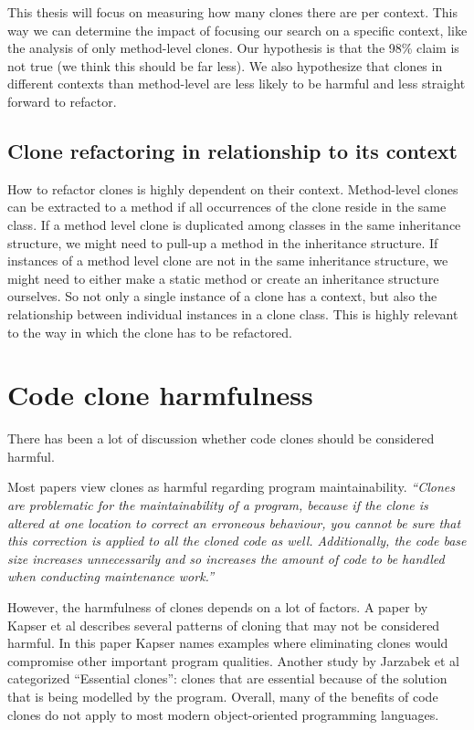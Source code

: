 This thesis will focus on measuring how many clones there are per context. This way we can determine the impact of focusing our search on a specific context, like the analysis of only method-level clones. Our hypothesis is that the 98\% claim is not true (we think this should be far less). We also hypothesize that clones in different contexts than method-level are less likely to be harmful and less straight forward to refactor.

\subsection{Clone refactoring in relationship to its context}
How to refactor clones is highly dependent on their context. Method-level clones can be extracted to a method \cite{kodhai2013method} if all occurrences of the clone reside in the same class. If a method level clone is duplicated among classes in the same inheritance structure, we might need to pull-up a method in the inheritance structure. If instances of a method level clone are not in the same inheritance structure, we might need to either make a static method or create an inheritance structure ourselves. So not only a single instance of a clone has a context, but also the relationship between individual instances in a clone class. This is highly relevant to the way in which the clone has to be refactored.

\section{Code clone harmfulness}
There has been a lot of discussion whether code clones should be considered harmful.

Most papers view clones as harmful regarding program maintainability. \textit{``Clones are problematic for the maintainability of a program, because if the clone is altered at one location to correct an erroneous behaviour, you cannot be sure that this correction is applied to all the cloned code as well. Additionally, the code base size increases unnecessarily and so increases the amount of code to be handled when conducting maintenance work.''} \cite{ostberg2014automatically}

However, the harmfulness of clones depends on a lot of factors. A paper by Kapser et al \cite{kapser2006cloning} describes several patterns of cloning that may not be considered harmful. In this paper Kapser names examples where eliminating clones would compromise other important program qualities. Another study by Jarzabek et al \cite{jarzabek2010clones} categorized ``Essential clones'': clones that are essential because of the solution that is being modelled by the program. Overall, many of the benefits of code clones do not apply to most modern object-oriented programming languages.
